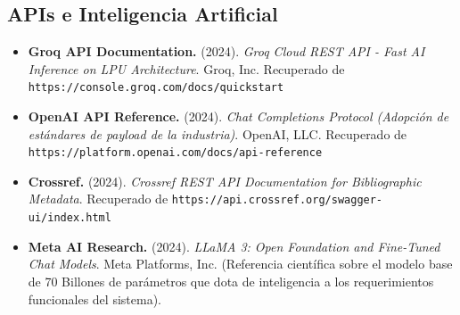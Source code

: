 \subsection{APIs e Inteligencia Artificial}
\begin{itemize}
    \item \textbf{Groq API Documentation.} (2024). \textit{Groq Cloud REST API - Fast AI Inference on LPU Architecture}. Groq, Inc. Recuperado de \texttt{https://console.groq.com/docs/quickstart}
    \item \textbf{OpenAI API Reference.} (2024). \textit{Chat Completions Protocol (Adopción de estándares de payload de la industria)}. OpenAI, LLC. Recuperado de \texttt{https://platform.openai.com/docs/api-reference}
    \item \textbf{Crossref.} (2024). \textit{Crossref REST API Documentation for Bibliographic Metadata}. Recuperado de \texttt{https://api.crossref.org/swagger-ui/index.html}
    \item \textbf{Meta AI Research.} (2024). \textit{LLaMA 3: Open Foundation and Fine-Tuned Chat Models}. Meta Platforms, Inc. (Referencia científica sobre el modelo base de 70 Billones de parámetros que dota de inteligencia a los requerimientos funcionales del sistema).
\end{itemize}

